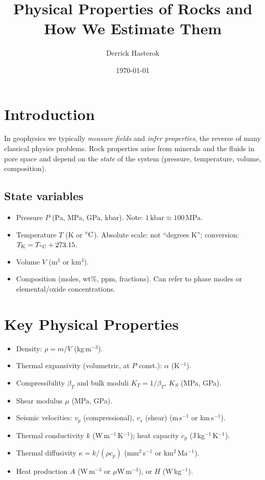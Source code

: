 \documentclass[11pt,a4paper]{article}
\title{Physical Properties of Rocks and How We Estimate Them}
\author{Derrick Hasterok}
\date{\today}
\begin{document}
\maketitle

\section{Introduction}
In geophysics we typically \emph{measure fields} and \emph{infer properties}, the reverse of many classical physics problems. Rock properties arise from minerals and the fluids in pore space and depend on the \emph{state} of the system (pressure, temperature, volume, composition).

\subsection{State variables}
\begin{itemize}
  \item Pressure $P$ (Pa, MPa, GPa, kbar). Note: $1\,\mathrm{kbar} \approx 100\,\mathrm{MPa}$.
  \item Temperature $T$ (K or $\degC$). Absolute scale: not ``degrees K''; conversion: $T_{\mathrm{K}} = T_{\degC} + 273.15$.
  \item Volume $V$ (m$^3$ or km$^3$).
  \item Composition (moles, wt\%, ppm, fractions). Can refer to phase modes or elemental/oxide concentrations.
\end{itemize}

\section{Key Physical Properties}
\begin{itemize}
  \item Density: $\rho = m/V$ (kg\,m$^{-3}$).
  \item Thermal expansivity (volumetric, at $P$ const.): $\alpha$ (K$^{-1}$).
  \item Compressibility $\beta_T$ and bulk moduli $K_T=1/\beta_T$, $K_S$ (MPa, GPa).
  \item Shear modulus $\mu$ (MPa, GPa).
  \item Seismic velocities: $v_p$ (compressional), $v_s$ (shear) (m\,s$^{-1}$ or km\,s$^{-1}$).
  \item Thermal conductivity $k$ (W\,m$^{-1}$\,K$^{-1}$); heat capacity $c_p$ (J\,kg$^{-1}$\,K$^{-1}$).
  \item Thermal diffusivity $\kappa = k/(\rho c_p)$ (mm$^2$\,s$^{-1}$ or km$^2$\,Ma$^{-1}$).
  \item Heat production $A$ (W\,m$^{-3}$ or $\mu$W\,m$^{-3}$), or $H$ (W\,kg$^{-1}$).
\end{itemize}
\end{document}
